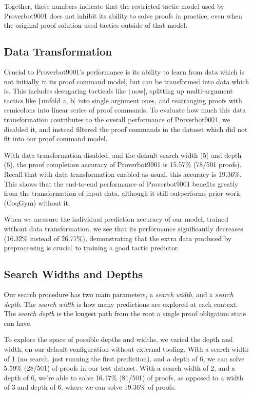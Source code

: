 \documentclass[sigplan,screen]{acmart}
\newcommand{\name}{Proverbot9001\xspace}
\newcommand{\coqinline}[1]{\texttt|#1|}
\renewcommand{\>}{\quad}
\begin{document}
Together, these numbers indicate that the restricted tactic model used by \name{}
  does not inhibit its ability to solve proofs in practice,
  even when the original proof solution used tactics outside of that model.

\subsection{Data Transformation}

Crucial to \name{}'s performance is its ability to learn from data
  which is not initially in its proof command model,
  but can be transformed into data which is.
This includes desugaring tacticals like \coqinline{now},
  splitting up multi-argument tactics like \coqinline{unfold a, b}
  into single argument ones,
  and rearranging proofs with semicolons into linear
  series of proof commands.
To evaluate how much this data transformation
  contributes to the overall performance of \name{},
  we disabled it, and instead filtered the proof commands
  in the dataset which did not fit into our proof command model.

With data transformation disabled,
  and the default search width (5) and depth (6),
  the proof completion accuracy of \name{} is
  15.57\% (78/501 proofs).
Recall that with data transformation enabled as usual,
  this accuracy is 19.36\%.
This shows that the end-to-end performance of \name{}
  benefits greatly from the transformation of input data,
  although it still outperforms prior work (CoqGym) without it.

When we measure the individual prediction accuracy of our model,
  trained without data transformation,
  we see that its performance significantly decreases
  (16.32\% instead of 26.77\%),
  demonstrating that the extra data produced by preprocessing
  is crucial to training a good tactic predictor.

\subsection{Search Widths and Depths}
\label{sssec:parameters}

Our search procedure has two main parameters,
  a \textit{search width}, and a \textit{search depth}.
The \textit{search width} is how many predictions are explored
  at each context.
The \textit{search depth} is the longest path from the root
  a single proof obligation state can have.

To explore the space of possible depths and widths,
  we varied the depth and width,
  on our default configuration without external tooling.
With a search width of 1 (no search, just running the first prediction),
  and a depth of 6,
  we can solve 5.59\% (28/501) of proofs in our test dataset.
With a search width of 2, and a depth of 6,
  we're able to solve 16.17\% (81/501) of proofs,
  as opposed to a width of 3 and depth of 6, where we can solve 19.36\% of proofs.
\end{document}

